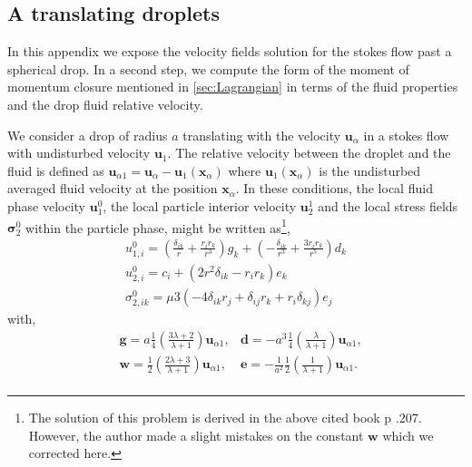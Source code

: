 \subsection*{A translating droplets}
\label{ap:Translating_sphere}





In this appendix we expose the velocity fields solution for the stokes flow past a spherical drop. 
In a second step, we compute the form of the moment of momentum closure mentioned in \ref{sec:Lagrangian} in terms of the fluid properties and the drop fluid relative velocity.

We consider a drop of radius $a$ translating with the velocity $\textbf{u}_\alpha$ in a stokes flow with undisturbed velocity $\textbf{u}_1$.
The relative velocity between the droplet and the fluid is defined as $\textbf{u}_{\alpha 1}= \textbf{u}_\alpha - \textbf{u}_1(\textbf{x}_\alpha)$ where $\textbf{u}_1(\textbf{x}_\alpha)$ is the undisturbed averaged fluid velocity at the position $\textbf{x}_\alpha$. 
In these conditions, the local fluid phase velocity $\textbf{u}_1^0$, the local particle interior velocity $\textbf{u}_2^1$ and the local stress fields $\bm\sigma_2^0$ within the particle phase, might be written as\citet{pozrikidis1992boundary}\footnote{The solution of this problem is derived in the above cited book p .207.  However, the author made a slight mistakes on the constant $\textbf{w}$ which we corrected here. }, 
\begin{align*}
    u_{1,i}^0
    = \left(\frac{\delta_{ik}}{r} + \frac{r_ir_k}{r^3}\right)  g_k
    + \left(-\frac{\delta_{ik}}{r^3} + \frac{3r_ir_k}{r^5}\right)  d_k\\
    u_{2,i}^0
    = c_i
    + \left(2 r^2 \delta_{ik} - r_ir_k\right) e_k\\
    \sigma_{2,ik}^0
    = \mu 3(
        - 4 \delta_{ik} r_j
        + \delta_{ij} r_k
        + r_i \delta_{kj}
    )e_j 
\end{align*}
with, 
\begin{align*}
    &\textbf{g} = a\frac{1}{4}\left(\frac{3\lambda + 2}{\lambda +1}\right) \textbf{u}_{\alpha 1},
    &\textbf{d} = -a^3\frac{1}{4}\left(\frac{\lambda}{\lambda +1}\right) \textbf{u}_{\alpha 1},\\
    &\textbf{w} = \frac{1}{2}\left(\frac{2\lambda + 3}{\lambda +1}\right) \textbf{u}_{\alpha 1},
    &\textbf{e} = -\frac{1}{a^2}\frac{1}{2}\left(\frac{1}{\lambda +1}\right)  \textbf{u}_{\alpha 1}.\\
\end{align*}

